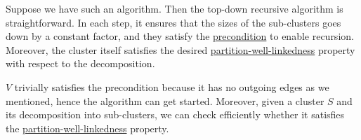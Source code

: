 Suppose we have such an algorithm. Then the top-down recursive algorithm is straightforward. In each step, it ensures that the sizes of the sub-clusters goes down by a constant factor, and they satisfy the \hyperref[def:precondition]{precondition} to enable recursion. Moreover, the cluster itself satisfies the desired \hyperref[def:partition-and-boundary-well-linked]{partition-well-linkedness} property with respect to the decomposition.

\begin{prev}
	\(V\) trivially satisfies the precondition because it has no outgoing edges as we mentioned, hence the algorithm can get started. Moreover, given a cluster \(S\) and its decomposition into sub-clusters, we can check efficiently whether it satisfies the \hyperref[def:partition-and-boundary-well-linked]{partition-well-linkedness} property.
\end{prev}

